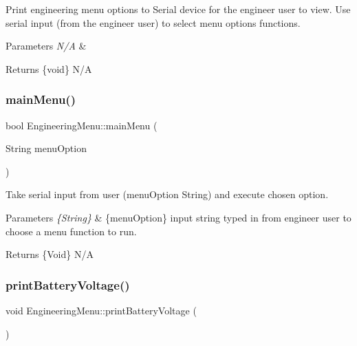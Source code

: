 Print engineering menu options to Serial device for the engineer user to view. Use serial input (from the engineer user) to select menu options functions. 
\begin{DoxyParams}{Parameters}
{\em N/A} & \\
\hline
\end{DoxyParams}
\begin{DoxyReturn}{Returns}
\{void\} N/A 
\end{DoxyReturn}
\mbox{\label{class_engineering_menu_a095890ce37adcbbe82ede76c6b2ddc06}} 
\subsubsection{\texorpdfstring{main\+Menu()}{mainMenu()}}
{\footnotesize\ttfamily bool Engineering\+Menu\+::main\+Menu (\begin{DoxyParamCaption}\item[{String}]{menu\+Option }\end{DoxyParamCaption})}

Take serial input from user (menu\+Option String) and execute chosen option. 
\begin{DoxyParams}{Parameters}
{\em \{\+String\}} & \{menu\+Option\} input string typed in from engineer user to choose a menu function to run. \\
\hline
\end{DoxyParams}
\begin{DoxyReturn}{Returns}
\{Void\} N/A 
\end{DoxyReturn}
\mbox{\label{class_engineering_menu_a6547a9143f33fe493c22d82b149d40bf}} 
\subsubsection{\texorpdfstring{print\+Battery\+Voltage()}{printBatteryVoltage()}}
{\footnotesize\ttfamily void Engineering\+Menu\+::print\+Battery\+Voltage (\begin{DoxyParamCaption}{ }\end{DoxyParamCaption})}

